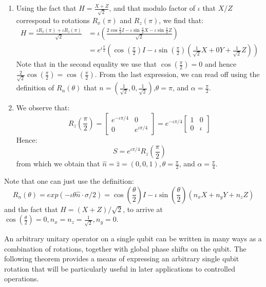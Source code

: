 \begin{example}
\begin{enumerate}
        \item Using the fact that $H=\frac{X+Z}{\sqrt{2}}$, and that modulo factor of $\iota$ that $X/Z$ correspond to rotations $R_x(\pi)$ and $R_z(\pi)$, we find that:
        \begin{align*}
            H=\frac{\iota R_x(\pi)+\iota R_z(\pi)}{\sqrt{2}}&=\iota\left(\frac{2\cos{\frac{\pi}{2}}I-\iota \sin\frac{\pi}{2}X-\iota 
            \sin\frac{\pi}{2} Z}{\sqrt{2}}\right)\\
            &=e^{\iota \frac{\pi}{2}} \left(\cos\left(\frac{\pi}{2}\right)I-\iota \sin\left(\frac{\pi}{2}\right)\left(\frac{1}{\sqrt{2}}X+0Y+\frac{1}{\sqrt{2}}Z\right)\right)
        \end{align*}
        Note that in the second equality we use that $\cos\left(\frac{\pi}{2}\right)=0$ and hence $\frac{2}{\sqrt{2}}\cos\left(\frac{\pi}{2}\right)=\cos\left(\frac{\pi}{2}\right)$. From the last expression, we can read off using the definition of $R_n(\theta)$ that $n=\left(\frac{1}{\sqrt{2}},0,\frac{1}{\sqrt{2}}\right)$,$\theta=\pi$, and $\alpha=\frac{\pi}{2}$.
        \item We observe that:
        \[
        R_z\left(\frac{\pi}{2}\right)=\begin{bmatrix} e^{-\iota \pi/4} & 0 \\ 0 & e^{\iota \pi/4} \end{bmatrix}=e^{-\iota \pi/4}\begin{bmatrix} 1 & 0 \\ 0 & \iota \end{bmatrix}
        \]
        Hence:
        \[
        S=e^{\iota \pi/4}R_z\left(\frac{\pi}{2}\right)
        \]
        from which we obtain that $\hat{n}=\hat{z}=(0,0,1),\theta=\frac{\pi}{2}$, and $\alpha=\frac{\pi}{4}$.
    \end{enumerate}
    Note that one can just use the definition:
    \[
    R_n(\theta)=exp(-\iota \theta \hat{n}\cdot \sigma/2)=\cos\left(\frac{\theta}{2}\right)I-\iota \sin\left(\frac{\theta}{2}\right)(n_xX+n_yY+n_zZ)
    \]
    and the fact that $H=(X+Z)/\sqrt{2}$, to arrive at $\cos\left(\frac{\theta}{2}\right)=0,n_x=n_z=\frac{1}{\sqrt{2}},n_y=0$.
\end{example}

An arbitrary unitary operator on a single qubit can be written in many ways as a combination of rotations, together with global phase shifts on the qubit. The following theorem provides a means of expressing an arbitrary single qubit rotation that will be particularly useful in later applications to controlled operations.

